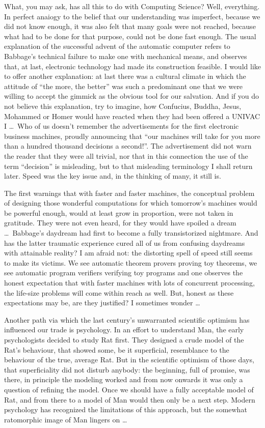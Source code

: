 \documentclass[10pt,letterpaper,twocolumn]{article}
\newcommand{\acro}[1]{{\small\MakeUppercase{#1}\spacefactor1000}}
\begin{document}
What, you may ask, has all this to do with Computing Science? Well, everything.
In perfect anaiogy to the belief that our understanding was imperfect, because
we did not know enough, it was also felt that many goals were not reached,
because what had to be done for that purpose, could not be done fast enough.
The usual explanation of the successful advent of the automatic computer refers
to Babbage's technical failure to make one with mechanical means, and observes
that, at last, electronic technology had made its construction feasible. I
would like to offer another explanation: at last there was a cultural climate
in which the attitude of ``the more, the better'' was such a predominant one
that we were willing to accept the gimmick as the obvious tool for our
salvation. And if you do not believe this explanation, try to imagine, how
Confucius, Buddha, Jesus, Mohammed or Homer would have reacted when they had
been offered a \acro{UNIVAC I} \ldots\ Who of us doesn't remember the
advertisements for the first electronic business machines, proudly announcing
that ``our machines will take for you more than a hundred thousand decisions a
second!''. The advertisement did not warn the reader that they were all
trivial, nor that in this connection the use of the term ``decision'' is
misleading, but to that misleading terminology I shall return later. Speed was
the key issue and, in the thinking of many, it still is. 

The first warnings that with faster and faster machines, the conceptual problem
of designing those wonderful computations for which tomorrow's machines would
be powerful enough, would at least grow in proportion, were not taken in
gratitude. They were not even heard, for they would have spoiled a dream
\ldots\ Babbage's daydream had first to become a fully transistorized
nightmare. And has the latter traumatic experience cured all of us from
confusing daydreams with attainable reality? I am afraid not: the distorting
spell of speed still seems to make its victims. We see automatic theorem
provers proving toy theorems, we see automatic program verifiers verifying toy
programs and one observes the honest expectation that with faster machines with
lots of concurrent processing, the life-size problems will come within reach as
well. But, honest as these expectations may be, are they justified? I sometimes
wonder \ldots

Another path via which the last century's unwarranted scientific optimism has
influenced our trade is psychology. In an effort to understand Man, the early
psychologists decided to study Rat first. They designed a crude model of the
Rat's behaviour, that showed some, be it superficial, resemblance to the
behaviour of the true, average Rat. But in the scientific optimism of those
days, that superficiality did not disturb anybody: the beginning, full of
promise, was there, in principle the modeling worked and from now onwards it
was only a question of refining the model. Once we should have a fully
acceptable model of Rat, and from there to a model of Man would then only be a
next step. Modern psychology has recognized the limitations of this approach,
but the somewhat ratomorphic image of Man lingers on \ldots 
\end{document}
